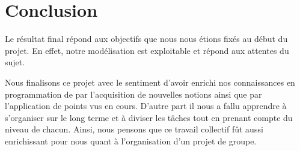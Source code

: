 \section{Conclusion}

Le résultat final répond aux objectifs que nous nous étions fixés au début du projet. En effet, notre modélisation est exploitable et répond aux attentes du sujet.

Nous finalisons ce projet avec le sentiment d’avoir enrichi nos connaissances en programmation de par l’acquisition de nouvelles notions ainsi que par l’application de points vus en cours. D’autre part il nous a fallu apprendre à s’organiser sur le long terme et à diviser les tâches tout en prenant compte du niveau de chacun. Ainsi, nous pensons que ce travail collectif fût aussi enrichissant pour nous quant à l’organisation d’un projet de groupe.